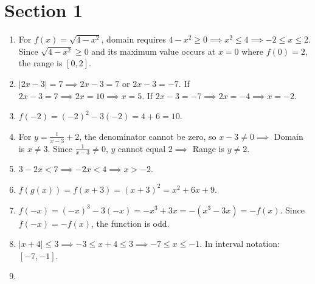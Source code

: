 \documentclass{article}
\begin{document}
\section*{Section 1}
\begin{enumerate}
    \item For $f(x) = \sqrt{4-x^2}$, domain requires $4-x^2 \ge 0 \implies x^2 \le 4 \implies -2 \le x \le 2$. Since $\sqrt{4-x^2} \ge 0$ and its maximum value occurs at $x=0$ where $f(0)=2$, the range is $[0, 2]$.
    \vspace{0.5cm}

    \item $|2x - 3| = 7 \implies 2x - 3 = 7$ or $2x - 3 = -7$.
    If $2x - 3 = 7 \implies 2x = 10 \implies x = 5$.
    If $2x - 3 = -7 \implies 2x = -4 \implies x = -2$.
    \vspace{0.5cm}

    \item $f(-2) = (-2)^2 - 3(-2) = 4 + 6 = 10$.
    \vspace{0.5cm}

    \item For $y = \frac{1}{x-3} + 2$, the denominator cannot be zero, so $x-3 \neq 0 \implies$ Domain is $x \neq 3$.
    Since $\frac{1}{x-3} \neq 0$, $y$ cannot equal $2 \implies$ Range is $y \neq 2$.
    \vspace{0.5cm}

    \item $3 - 2x < 7 \implies -2x < 4 \implies x > -2$.
    \vspace{0.5cm}

    \item $f(g(x)) = f(x+3) = (x+3)^2 = x^2 + 6x + 9$.
    \vspace{0.5cm}

    \item $f(-x) = (-x)^3 - 3(-x) = -x^3 + 3x = -(x^3 - 3x) = -f(x)$. Since $f(-x) = -f(x)$, the function is odd.
    \vspace{0.5cm}

    \item $|x+4| \le 3 \implies -3 \le x+4 \le 3 \implies -7 \le x \le -1$. In interval notation: $[-7, -1]$.
    \vspace{0.5cm}

    \item 
    \vspace{0.5cm}


\end{enumerate}
\end{document}
